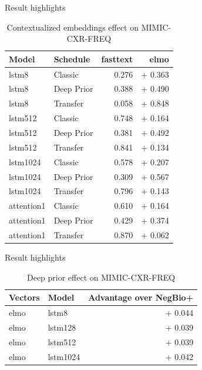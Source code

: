 \documentclass[pdf]{beamer}
\newcommand{\?}{\ensuremath{^\texttt{\bf [CITATION~NEEDED]}}}
\begin{document}
\begin{frame}{Result highlights}

\begin{table}
\caption{Contextualized embeddings effect on MIMIC-CXR-FREQ}
\label{context-effect}
\small
\begin{tabular}{llrr}
\toprule
 Model       &  Schedule & fasttext &  elmo \\
\midrule
lstm8 & Classic & 0.276 & + 0.363 \\
lstm8 & Deep Prior & 0.388 & + 0.490 \\
lstm8 & Transfer & 0.058 & + 0.848 \\
lstm512 & Classic & 0.748 & + 0.164 \\
lstm512 & Deep Prior & 0.381 & + 0.492 \\
lstm512 & Transfer & 0.841 & + 0.134 \\
lstm1024 & Classic & 0.578 & + 0.207 \\
lstm1024 & Deep Prior & 0.309 & + 0.567 \\
lstm1024 & Transfer & 0.796 & + 0.143 \\
attention1 & Classic & 0.610 & + 0.164 \\
attention1 & Deep Prior & 0.429 & + 0.374 \\
attention1 & Transfer & 0.870 & + 0.062 \\
\bottomrule
\end{tabular}
\end{table}

\end{frame}

\begin{frame}{Result highlights}

\begin{table}
\caption{Deep prior effect on MIMIC-CXR-FREQ}
\label{deepprior-effect}
\begin{tabular}{llr}
\toprule
 Vectors & Model       &  Advantage over NegBio+ \\
\midrule
                   elmo &             lstm8 &    + 0.044 \\
                   elmo &           lstm128 &    + 0.039 \\
                   elmo &           lstm512 &    + 0.039 \\
                   elmo &          lstm1024 &   + 0.042 \\
\bottomrule
\end{tabular}
\end{table}

\end{frame}
\end{document}
